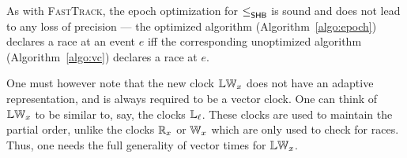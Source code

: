 As with \textsc{FastTrack}, the epoch optimization for $\leq^{}_{\mathsf{SHB}}$
is sound and does not lead to any loss of precision --- the optimized
algorithm (Algorithm~\ref{algo:epoch}) declares a race at an event $e$ 
iff the corresponding unoptimized algorithm (Algorithm~\ref{algo:vc}) declares a race at $e$.

One must however note that the new clock $\mathbb{LW}_x$
does not have an adaptive representation, and is always
required to be a vector clock. 
One can think of $\mathbb{LW}_x$ to be similar to, say, the clocks $\mathbb{L}_\ell$.
These clocks are used to maintain the partial order,
unlike the clocks $\mathbb{R}_x$ or $\mathbb{W}_x$ which are only
used to check for races.
Thus, one needs the full generality of vector times for $\mathbb{LW}_x$.
